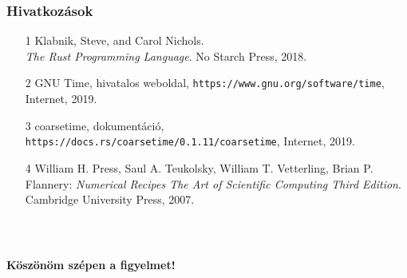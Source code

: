 \documentclass{beamer}
\begin{document}
\begin{frame}[fragile]
\frametitle{Hivatkozások}

\begin{itemize}

\item[1] Klabnik, Steve, and Carol Nichols. \\
\emph{The Rust Programming Language}.
No Starch Press, 2018.

\item[2] GNU Time, hivatalos weboldal, \texttt{https://www.gnu.org/software/time}, \\
Internet, 2019.

\item[3] coarsetime, dokumentáció, \texttt{https://docs.rs/coarsetime/0.1.11/coarsetime}, Internet, 2019.

\item[4] William H. Press, Saul A. Teukolsky, William T. Vetterling, Brian P. Flannery: \emph{Numerical Recipes The Art of Scientific Computing Third Edition}. \\
Cambridge University Press, 2007.

\end{itemize}

\end{frame}

\begin{frame}[fragile]
    \frametitle{\ }

\begin{center}
\huge \textbf{Köszönöm szépen a figyelmet!}
\end{center}

\end{frame}
\end{document}
